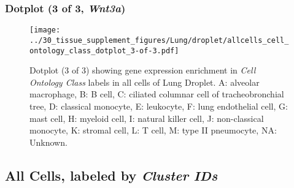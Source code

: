 \clearpage

\subsubsection{Dotplot (3 of 3, \emph{Wnt3a})}
\begin{figure}[h]
\centering
\texttt{[image: ../30\_tissue\_supplement\_figures/Lung/droplet/allcells\_cell\_ontology\_class\_dotplot\_3-of-3.pdf]}

\caption{ Dotplot (3 of 3)  showing gene expression enrichment in \emph{Cell Ontology Class} labels in all cells of Lung Droplet. A: alveolar macrophage, B: B cell, C: ciliated columnar cell of tracheobronchial tree, D: classical monocyte, E: leukocyte, F: lung endothelial cell, G: mast cell, H: myeloid cell, I: natural killer cell, J: non-classical monocyte, K: stromal cell, L: T cell, M: type II pneumocyte, NA: Unknown.}
\end{figure}


\clearpage

\subsection{All Cells, labeled by \emph{Cluster IDs}}
